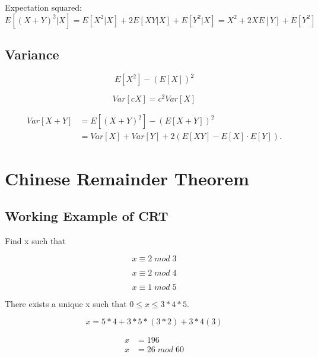 \documentclass[twoside]{article}
\begin{document}
Expectation squared:
\begin{equation}
E [(X+Y)^2 | X]  = E [X^2 | X ] + 2E[XY |X] + E[Y^2|X]  = X^2 +
2XE[Y] + E[Y^2] 
\end{equation}

\subsection{Variance}
\begin{equation}
E [X^2]   -(E [X])^2
\end{equation}

\begin{equation}
Var [cX] = c^2 Var[X] 
\end{equation}

\begin{align}
Var [X + Y ] &= E [(X + Y )^2]  − (E [X + Y ])^2\\
&= Var [X] + Var [Y ] + 2(E [XY ] − E [X] · E [Y ]).
\end{align}

\section{Chinese Remainder Theorem}

\subsection{Working Example of CRT}
Find x such that 

\begin{equation}
	x \equiv 2 \; mod \;3 
\end{equation}

\begin{equation}
	x \equiv 2 \; mod \;4 
\end{equation}

\begin{equation}
	x \equiv 1 \; mod \;5 
\end{equation}

There exists a unique x such that $0 \leq x \leq 3*4*5$. 

\begin{equation}
x =   5 * 4 + 3 * 5 * ( 3 * 2 )  + 3 * 4 ( 3 )   
\end{equation}

\begin {align}
	x &= 196\\
	x &= 26 \; mod \; 60
\end {align}
\end{document}
